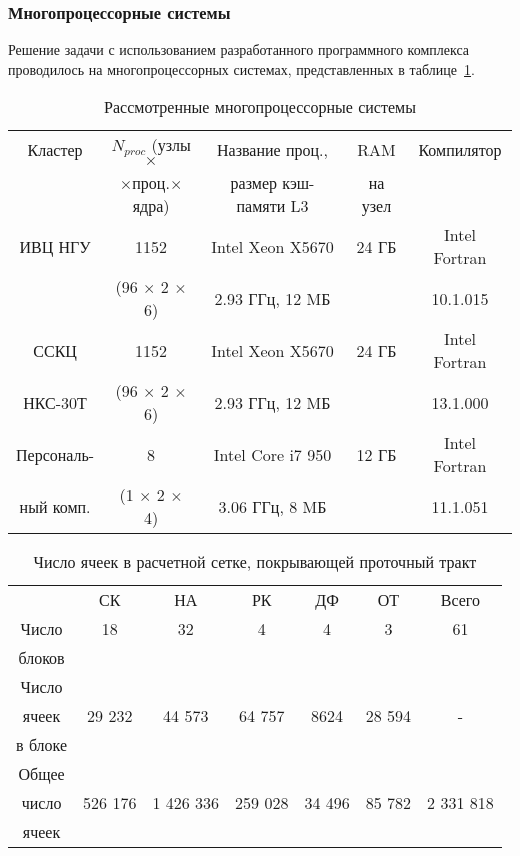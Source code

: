 \subsubsection{Многопроцессорные системы}
\label{s:1631}
Решение задачи с использованием разработанного программного комплекса проводилось на многопроцессорных 
системах, представленных в таблице~\ref{tab:2}.
\begin{table}[h!]
  \caption{Рассмотренные многопроцессорные системы}
  \center
  \begin{tabular}{|c|c|c|c|c|}
  \hline
  Кластер & $N_{proc}$ (узлы$\times$ & Название проц.,    & RAM         &  Компилятор \\
          & $\times$проц.$\times$ядра) & размер кэш-памяти L3 & на узел &
  \\ \hhline{=|=|=|=|=} 
  ИВЦ НГУ & 1152  & Intel Xeon X5670  & 24 ГБ & Intel Fortran \\
          & (96 $\times$ 2 $\times$ 6)& 2.93 ГГц, 12 MБ & & 10.1.015
  \\ \hline
  ССКЦ  & 1152  & Intel Xeon X5670  & 24 ГБ & Intel Fortran \\
  НКС-30Т & (96 $\times$ 2 $\times$ 6)& 2.93 ГГц, 12 MБ & & 13.1.000
  \\ \hline
  Персональ- & 8  & Intel Core i7 950  & 12 ГБ & Intel Fortran \\
  ный комп.  & (1 $\times$ 2 $\times$ 4)& 3.06 ГГц, 8 MБ & & 11.1.051
  \\ \hline
  \end{tabular}
  \label{tab:2}
\end{table}
\begin{table}[h!]
  \caption{Число ячеек в расчетной сетке, покрывающей проточный тракт}
  \center
  \begin{tabular}{|c|c|c|c|c|c|c|}
  \hline
    & СК & НА & РК & ДФ & ОТ & Всего 
  \\ \hhline{=|=|=|=|=|=|=} 
   Число & 18  & 32 & 4  & 4 & 3 & 61 \\
   блоков&     &    &    &   &   & 
  \\ \hline
   Число  &         &        &         &       &         &   \\
   ячеек  &  29 232 & 44 573 &  64 757 & 8624  & 28 594  & - \\
   в блоке&         &        &         &       &         & 
  \\ \hline
   Общее  &          &           &         &        &         &           \\
   число  &  526 176 & 1 426 336 & 259 028 & 34 496 & 85 782  & 2 331 818 \\
   ячеек  &          &           &         &        &         & 
  \\ \hline
  \end{tabular}
  \label{tab:3}
\end{table}

